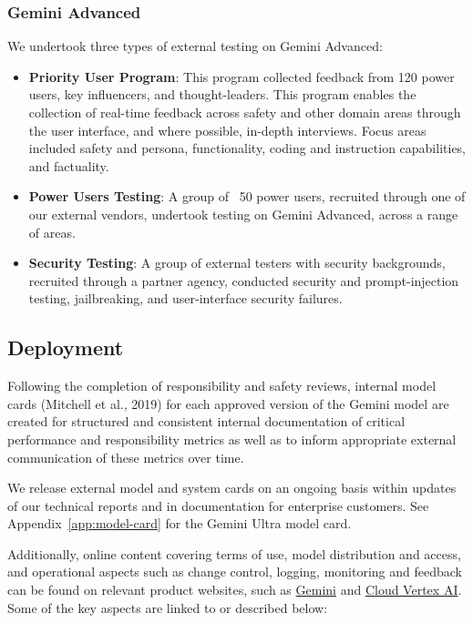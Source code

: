 \subsubsection{Gemini Advanced}
We undertook three types of external testing on Gemini Advanced: 
\begin{itemize}
    \item \textbf{Priority User Program}: This program collected feedback from 120 power users, key influencers, and thought-leaders. This program enables the collection of real-time feedback across safety and other domain areas through the user interface, and where possible, in-depth interviews. Focus areas included safety and persona, functionality, coding and instruction capabilities, and factuality. 
\item \textbf{Power Users Testing}: A group of ~50 power users, recruited through one of our external vendors, undertook testing on Gemini Advanced, across a range of areas.
\item \textbf{Security Testing}:  A group of external testers with security backgrounds, recruited through a partner agency, conducted security and prompt-injection testing, jailbreaking, and user-interface security failures. 
\end{itemize}

\subsection{Deployment}

Following the completion of responsibility and safety reviews, internal model cards (Mitchell et al., 2019) for each approved version of the Gemini model are created for structured and consistent internal documentation of critical performance and responsibility metrics as well as to inform appropriate external communication of these metrics over time. 

We release external model and system cards on an ongoing basis within updates of our technical reports and in documentation for enterprise customers. See Appendix~\ref{app:model-card} for the Gemini Ultra model card. 

Additionally, online content covering terms of use, model distribution and access, and operational aspects such as change control, logging, monitoring and feedback can be found on relevant product websites, such as \href{https://gemini.google.com/faq}{Gemini} and \href{https://cloud.google.com/vertex-ai/docs}{Cloud Vertex AI}. Some of the key aspects are linked to or described below: 

